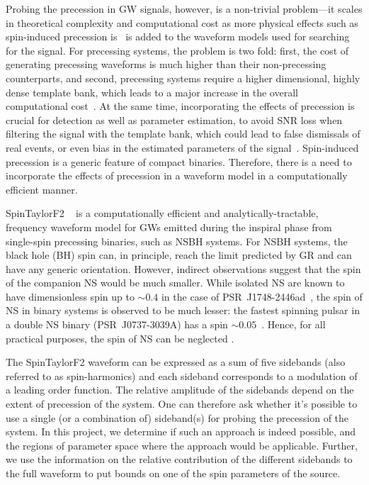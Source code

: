 Probing the precession in GW signals, however, is a non-trivial problem---it
scales in theoretical complexity and computational cost as more physical
effects such as spin-induced precession is~\cite{Apostolatos1994} is added to
the waveform models used for searching for the signal. For precessing systems,
the problem is two fold: first, the cost of generating precessing waveforms is
much higher than their non-precessing counterparts, and second, precessing
systems require a higher dimensional, highly dense template bank, which leads
to a major increase in the overall computational cost~\cite{PE_cost, Nat2017}.
At the same time, incorporating the effects of precession is crucial for
detection as well as parameter estimation, to avoid SNR loss when filtering
the signal with the template bank, which could lead to false dismissals of
real events, or even bias in the estimated parameters of the
signal~\cite{Bias_1}. Spin-induced precession is a generic feature of compact
binaries.  Therefore, there is a need to incorporate the effects of precession
in a waveform model in a computationally efficient manner.

SpinTaylorF2 ~\cite{Lundgren2014} is a computationally efficient
and analytically-tractable, frequency waveform model for GWs emitted during
the inspiral phase from single-spin precessing binaries, such as NSBH systems.
For NSBH systems, the black hole (BH) spin can, in principle, reach the limit
predicted by GR and can have any generic orientation. However, indirect
observations suggest that the spin of the companion NS would be much smaller.
While isolated NS are known to have dimensionless spin up to $\sim 0.4$ in the
case of PSR~J1748-2446ad~\cite{PSR2006}, the spin of NS in binary systems is
observed to be much lesser: the fastest spinning pulsar in a double NS
binary (PSR~J0737-3039A) has a spin $\sim 0.05$~\cite{BURGAY2003}. Hence, for
all practical purposes, the spin of NS can be neglected \cite{Lorimer:2008se}.

The SpinTaylorF2 waveform can be expressed as a sum of five sidebands (also
referred to as spin-harmonics) and each sideband corresponds to a modulation
of a leading order function. The relative amplitude of the sidebands depend on
the extent of precession of the system. One can therefore ask whether it's
possible to use a single (or a combination of) sideband(s) for probing the
precession of the system. In this project, we determine if such an approach is
indeed possible, and the regions of parameter space where the approach would
be applicable. Further, we use the information on the relative contribution
of the different sidebands to the full waveform to put bounds on one of the spin
parameters of the source.
